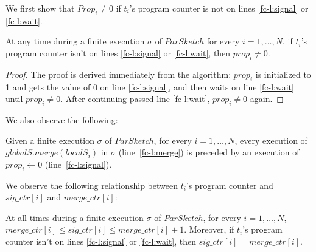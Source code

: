 We first show that $Prop_i \neq 0$ if $t_i$'s program counter is not on lines \ref{fc-l:signal} or \ref{fc-l:wait}.
\begin{invariant}
    At any time during a finite execution $\sigma$ of $ParSketch$ for every $i=1,\dots,N$, if $t_i$'s program
    counter isn't on lines \ref{fc-l:signal} or \ref{fc-l:wait}, then $prop_i \neq 0$.
    \label{fc-inv:prop-neq-0}
\end{invariant}
\begin{proof}
    The proof is derived immediately from the algorithm: $prop_i$ is initialized to 1 and gets
    the value of 0 on line \ref{fc-l:signal}, and then waits on line \ref{fc-l:wait} until $prop_i \neq 0$.
    After continuing passed line \ref{fc-l:wait}, $prop_i \neq 0$ again.
\end{proof}

We also observe the following:
\begin{observation}
    Given a finite execution $\sigma$ of $ParSketch$, for every $i=1,\dots,N$, every execution
    of $globalS.merge(localS_i)$ in $\sigma$ (line~\ref{fc-l:merge}) is preceded by an execution of $prop_i \leftarrow 0$
    (line~\ref{fc-l:signal}).
\end{observation}

We observe the following relationship between $t_i$'s program counter and $sig\_ctr[i]$ and \linebreak
$merge\_ctr[i]$:
\begin{observation}
    At all times during a finite execution $\sigma$ of $ParSketch$, for every
    $i=1,\dots,N$, $merge\_ctr[i] \leq sig\_ctr[i] \leq merge\_ctr[i] + 1$.
    Moreover, if $t_i$'s program counter isn't on lines \ref{fc-l:signal} or \ref{fc-l:wait}, then $sig\_ctr[i]=merge\_ctr[i]$.
    \label{fc-obs:counter_relationship}
\end{observation}

